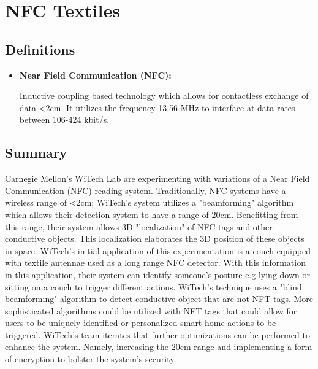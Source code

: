 \documentclass{article}
\begin{document}
\section*{NFC Textiles}


\subsection*{Definitions}

\begin{itemize}
  \item \textbf{Near Field Communication (NFC):}

  Inductive coupling based technology which allows for contactless exchange of data <2cm. 
  It utilizes the frequency 13.56 MHz to interface at data rates between 106-424 kbit/s.
\end{itemize}



\subsection*{Summary}
Carnegie Mellon's WiTech Lab are experimenting with variations of a Near Field Communication (NFC) reading system.
Traditionally, NFC systems have a wireless range of <2cm; WiTech's system utilizes a "beamforming" algorithm
which allows their detection system to have a range of 20cm.
Benefitting from this range, their system allows 3D "localization" of NFC tags and other conductive objects. 
This localization elaborates the 3D position 
of these objects in space.
WiTech's initial application of this experimentation is a couch equipped with textile 
antennae used as a long range NFC detector. 
With this information in this application, their system can identify someone's posture e.g lying down 
or sitting on a couch to trigger different actions.
WiTech's technique uses a "blind beamforming" algorithm to detect conductive object that are 
not NFT tags. More sophisticated algorithms could be utilized with NFT tags that could
allow for users to be uniquely identified or personalized smart home actions to be triggered. WiTech's team iterates that
further optimizations can be performed to enhance the system. Namely, 
increasing the 20cm range and implementing a 
form of encryption to bolster the system's security.
\end{document}
